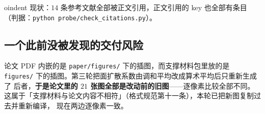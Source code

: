 \documentclass[11pt,a4paper]{ctexart}
\newcommand{\src}[1]{\texttt{#1}}
\begin{document}
oindent 现状：$14$ 条参考文献全部被正文引用，正文引用的 key 也全部有条目
（判据：\texttt{python probe/check\_citations.py}）。

\subsection{一个此前没被发现的交付风险}

论文 PDF 内嵌的是 \src{paper/figures/} 下的插图，而支撑材料包里放的是
\src{figures/} 下的插图。第三轮把面扩散系数由调和平均改成算术平均后只重新生成了
后者，\textbf{于是论文里的 $21$ 张图全部是改动前的旧图}——逐像素比较全部不同。
这属于「支撑材料与论文内容不相符」（格式规范第十一条），本轮已把新图复制过去并重新编译，
现在两边逐像素一致。
\end{document}
